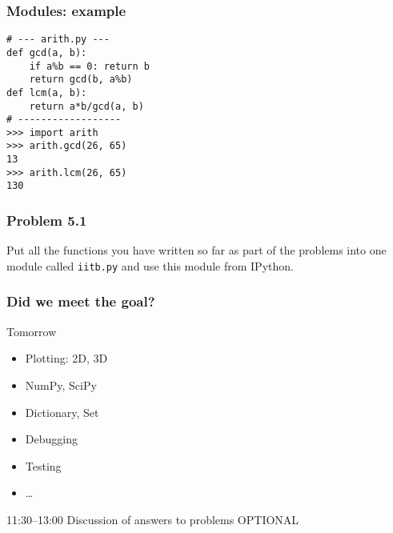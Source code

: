 \documentclass[14pt,compress]{beamer}
\newcounter{time}
\newcommand{\inctime}[1]{\addtocounter{time}{#1}{\tiny \thetime\ m}}
\newcommand{\typ}[1]{\texttt{#1}}
\begin{document}
\begin{frame}[fragile]
  \frametitle{Modules: example}
  \begin{lstlisting}
# --- arith.py ---
def gcd(a, b):
    if a%b == 0: return b
    return gcd(b, a%b)
def lcm(a, b):
    return a*b/gcd(a, b)
# ------------------
>>> import arith
>>> arith.gcd(26, 65)
13
>>> arith.lcm(26, 65)
130
  \end{lstlisting}
\end{frame}

\begin{frame}[fragile]
  \frametitle{Problem 5.1}

  Put all the functions you have written so far as part of the problems
  into one module called \typ{iitb.py} and use this module from IPython.

\inctime{20}
\end{frame}

\begin{frame}
  \frametitle{Did we meet the goal?}
  \tableofcontents
  \end{frame}

  \begin{frame}
    {Tomorrow}
    \begin{itemize}
      \item Plotting: 2D, 3D
      \item NumPy, SciPy
      \item Dictionary, Set
      \item Debugging
      \item Testing
      \item \ldots
    \end{itemize}
    11:30--13:00 Discussion of answers to problems OPTIONAL
  \end{frame}
\end{document}
